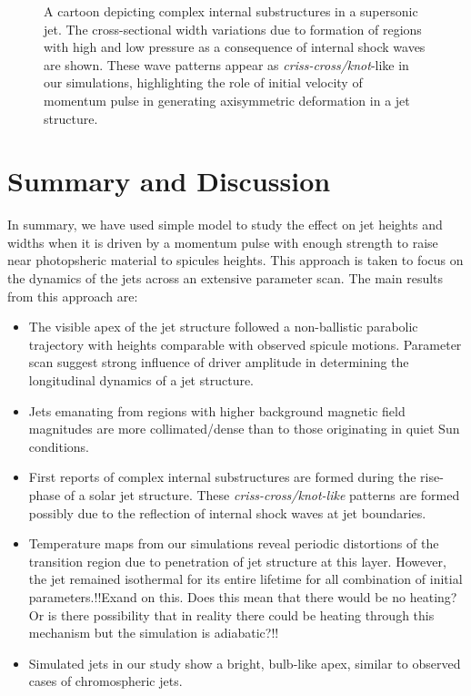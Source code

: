 \documentclass[12pt]{ociamthesis}
\begin{document}
\begin{figure}
\captionsetup[subfigure]{labelformat=empty}
\centering
{}
\caption{A cartoon depicting complex internal substructures in a supersonic jet. The cross-sectional width variations due to formation of regions with high and low pressure as a consequence of internal shock waves are shown. These wave patterns appear as \textit{criss-cross/knot}-like in our simulations, highlighting the role of initial velocity of momentum pulse in generating axisymmetric deformation in a jet structure. }
\label{cartoon_jet_waves}
\end{figure}
\section{Summary and Discussion}
\label{sec:c2discussion}
In summary, we have used simple model to study the effect on jet heights and widths when it is driven by a momentum pulse with enough strength to raise near photopsheric material to spicules heights. This approach is taken to focus on the dynamics of the jets across an extensive parameter scan. The main results from this approach are:   
\begin{itemize}
\item{The visible apex of the jet structure followed a non-ballistic parabolic trajectory with heights comparable with observed spicule motions. Parameter scan suggest strong influence of driver amplitude in determining the longitudinal dynamics of a jet structure.}

\item{Jets emanating from regions with higher background magnetic field magnitudes are more collimated/dense than to those originating in quiet Sun conditions.}

\item{First reports of complex internal substructures are formed during the rise-phase of a solar jet structure. These \textit{criss-cross/knot-like} patterns are formed possibly due to the reflection of internal shock waves at jet boundaries.}

\item{Temperature maps from our simulations reveal periodic distortions of the transition region due to penetration of jet structure at this layer. However, the jet remained isothermal for its entire lifetime for all combination of initial parameters.{\color{green}!!Exand on this. Does this mean that there would be no heating? Or is there possibility that in reality there could be heating through this mechanism but the simulation is adiabatic?!!}}

\item{Simulated jets in our study show a bright, bulb-like apex, similar to observed cases of chromospheric jets.}
\end{itemize}
\end{document}
